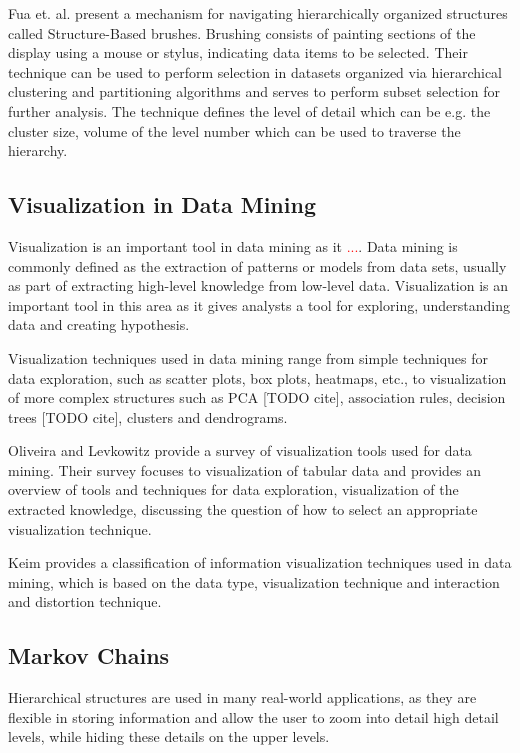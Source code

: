 Fua et. al. \cite{Fua:2000:SBM:614278.614457} present a mechanism for navigating hierarchically organized structures
called Structure-Based brushes. Brushing consists of painting sections of the display using a mouse or stylus, indicating
data items to be selected. Their technique can be used to perform selection in datasets organized via hierarchical
clustering and partitioning algorithms and serves to perform subset selection for further analysis. The technique defines
the level of detail which can be e.g. the cluster size, volume of the level number which can be used to traverse the
hierarchy.

\subsection{Visualization in Data Mining}

Visualization is an important tool in data mining as it \textcolor{red}{...}. Data mining is commonly defined
as the extraction of patterns or models from data sets, usually as part of extracting high-level
knowledge from low-level data. Visualization is an important tool in this area as it gives analysts a
tool for exploring, understanding data and creating hypothesis.

Visualization techniques used in data mining range from simple techniques for data exploration, such as
scatter plots, box plots, heatmaps, etc., to visualization of more complex structures such as PCA [TODO cite],
association rules, decision trees [TODO cite], clusters and dendrograms.

Oliveira and Levkowitz \cite{1207445} provide a survey of visualization tools used for data mining. Their survey focuses
to visualization of tabular data and provides an overview of tools and techniques for data exploration,
visualization of the extracted knowledge, discussing the question of how to select an appropriate visualization
technique.

Keim \cite{981847} provides a classification of information visualization techniques used in data mining, which is based on
the data type, visualization technique and interaction and distortion technique.

\subsection{Markov Chains}

Hierarchical structures are used in many real-world applications, as they are flexible in storing information
and allow the user to zoom into detail high detail levels, while hiding these details on the upper levels.

